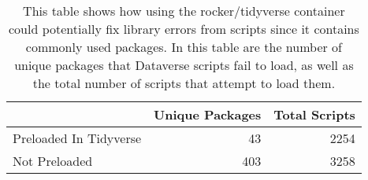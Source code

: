 \begin{table}
\centering
\caption{This table shows how using the rocker/tidyverse container could potentially fix library errors from scripts since it contains commonly used packages. In this table are the number of unique packages that Dataverse scripts fail to load, as well as the total number of scripts that attempt to load them.}
\label{tab:packs-in-tidy}
\begin{tabular}{lrr}
\toprule
{} &  Unique Packages &  Total Scripts \\
\midrule
Preloaded In Tidyverse &               43 &           2254 \\ \hline
Not Preloaded          &              403 &           3258 \\
\bottomrule
\end{tabular}
\end{table}
